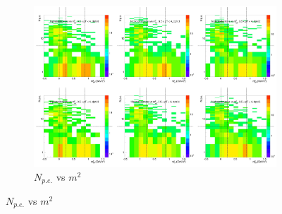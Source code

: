 \begin{figure}[H]
  \centering
    \begin{subfigure}{1\textwidth}
    \includegraphics[width=1\textwidth]{hiptfits/pos/PSaccthreshold_cent0_ich1_accfire0_ptbin13.jpg}
    \caption{$N_{p.e.}$ vs $m^2$}
    \end{subfigure}
\end{figure}
